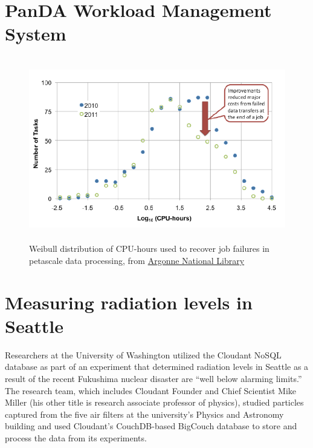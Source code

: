 
\section{PanDA Workload Management System}


\begin{figure}
\centering
\includegraphics[width=14cm,height=8cm]{images/panda.png}
\caption{Weibull distribution of CPU-hours used to recover job failures in petascale data processing, from \href{https://sharepoint.anl.gov/hep/HEP\%20Accomplishments/Highlights_101212.pdf}{Argonne National Library}}
\end{figure}








\section{Measuring radiation levels in Seattle}



Researchers at the University of Washington utilized the Cloudant NoSQL database as part of an experiment that determined radiation levels in Seattle as a result of the recent Fukushima nuclear disaster are “well below alarming limits.” The research team, which includes Cloudant Founder and Chief Scientist Mike Miller (his other title is research associate professor of physics), studied particles captured from the five air filters at the university’s Physics and Astronomy building and used Cloudant’s CouchDB-based BigCouch database to store and process the data from its experiments.

